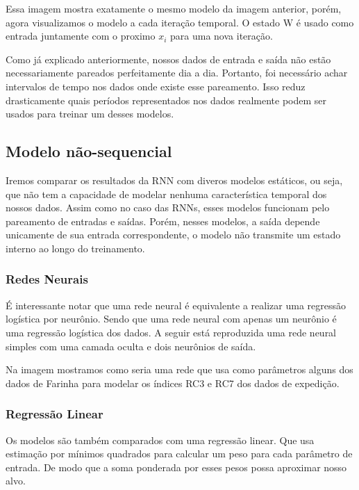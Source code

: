 % 


Essa imagem mostra exatamente o mesmo modelo da imagem anterior, porém, agora visualizamos o modelo a cada iteração temporal. O estado W é usado como entrada juntamente com o proximo $x_i$ para uma nova iteração.

\bigskip

Como já explicado anteriormente, nossos dados de entrada e saída não estão necessariamente pareados perfeitamente dia a dia. Portanto, foi necessário achar intervalos de tempo nos dados onde existe esse pareamento. Isso reduz drasticamente quais períodos representados nos dados realmente podem ser usados para treinar um desses modelos.



\subsection{Modelo não-sequencial}



Iremos comparar os resultados da RNN com diveros modelos estáticos, ou seja, que não tem a capacidade de modelar nenhuma característica temporal dos nossos dados. Assim como no caso das RNNs, esses modelos funcionam pelo pareamento de entradas e saídas. Porém, nesses modelos, a saída depende unicamente de sua entrada correspondente, o modelo não transmite um estado interno ao longo do treinamento.



\subsubsection{Redes Neurais}




É interessante notar que uma rede neural é equivalente a realizar uma regressão logística por neurônio. Sendo que uma rede neural com apenas um neurônio é uma regressão logística dos dados. A seguir está reproduzida uma rede neural simples com uma camada oculta e dois neurônios de saída.




%



Na imagem mostramos como seria uma rede que usa como parâmetros alguns dos dados de Farinha para modelar os índices RC3 e RC7 dos dados de expedição.

\bigskip
\subsubsection{Regressão Linear}
Os modelos são também comparados com uma regressão linear. Que usa estimação por mínimos quadrados para calcular um peso para cada parâmetro de entrada. De modo que a soma ponderada por esses pesos possa aproximar nosso alvo.


